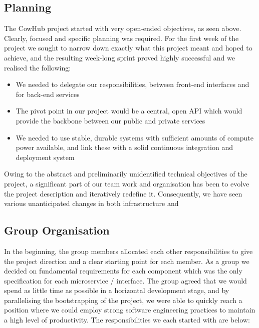 
\subsection{Planning}

The CowHub project started with very open-ended objectives, as seen above. Clearly, focused and specific planning was required. For the first week of the project we sought to narrow down exactly what this project meant and hoped to achieve, and the resulting week-long sprint proved highly successful and we realised the following:

\begin{itemize}
	\item We needed to delegate our responsibilities, between front-end interfaces and for back-end services
	\item The pivot point in our project would be a central, open API which would provide the backbone between our public and private services
	\item We needed to use stable, durable systems with sufficient amounts of compute power available, and link these with a solid continuous integration and deployment system
\end{itemize}

Owing to the abstract and preliminarily unidentified technical objectives of the project, a significant part of our team work and organisation has been to evolve the project description and iteratively redefine it. Consequently, we have seen various unanticipated changes in both infrastructure and 


\subsection{Group Organisation}

In the beginning, the group members allocated each other responsibilities to give the project direction and a clear starting point for each member. As a group we decided on fundamental requirements for each component which was the only specification for each microservice / interface. The group agreed that we would spend as little time as possible in a horizontal development stage, and by parallelising the bootstrapping of the project, we were able to quickly reach a position where we could employ strong software engineering practices to maintain a high level of productivity. The responsibilities we each started with are below:

